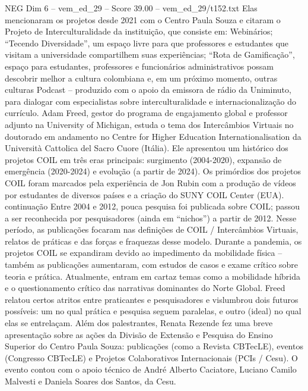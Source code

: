 \begin{textsample}{NEG Dim 6 – vem\_ed\_29 – Score 39.00 – vem\_ed\_29/t152.txt}
Elas mencionaram os projetos desde 2021 com o Centro Paula Souza e citaram o Projeto de Interculturalidade da instituição, que consiste em: Webinários; “Tecendo Diversidade”, um espaço livre para que professores e estudantes que visitam a universidade compartilhem suas experiências; “Rota de Gamificação”, espaço para estudantes, professores e funcionários administrativos possam descobrir melhor a cultura colombiana e, em um próximo momento, outras culturas Podcast – produzido com o apoio da emissora de rádio da Uniminuto, para dialogar com especialistas sobre interculturalidade e internacionalização do currículo.
Adam Freed, gestor do programa de engajamento global e professor adjunto na University of Michigan, estuda o tema dos Intercâmbios Virtuais no doutorado em andamento no Centre for Higher Education Internationalisation da Università Cattolica del Sacro Cuore (Itália).
Ele apresentou um histórico dos projetos COIL em três eras principais: surgimento (2004-2020), expansão de emergência (2020-2024) e evolução (a partir de 2024).
Os primórdios dos projetos COIL foram marcados pela experiência de Jon Rubin com a produção de vídeos por estudantes de diversos países e a criação do SUNY COIL Center (EUA). continuação Entre 2004 e 2012, pouca pesquisa foi publicada sobre COIL; passou a ser reconhecida por pesquisadores (ainda em “nichos”) a partir de 2012.
Nesse período, as publicações focaram nas definições de COIL / Intercâmbios Virtuais, relatos de práticas e das forças e fraquezas desse modelo.
Durante a pandemia, os projetos COIL se expandiram devido ao impedimento da mobilidade física – também as publicações aumentaram, com estudos de casos e exame crítico sobre teoria e prática.
Atualmente, entram em cartaz temas como a mobilidade híbrida e o questionamento crítico das narrativas dominantes do Norte Global.
Freed relatou certos atritos entre praticantes e pesquisadores e vislumbrou dois futuros possíveis: um no qual prática e pesquisa seguem paralelas, e outro (ideal) no qual elas se entrelaçam.
Além dos palestrantes, Renata Rezende fez uma breve apresentação sobre as ações da Divisão de Extensão e Pesquisa do Ensino Superior do Centro Paula Souza: publicações (como a Revista CBTecLE), eventos (Congresso CBTecLE) e Projetos Colaborativos Internacionais (PCIs / Cesu).
O evento contou com o apoio técnico de André Alberto Caciatore, Luciano Camilo Malvesti e Daniela Soares dos Santos, da Cesu.

\end{textsample}
